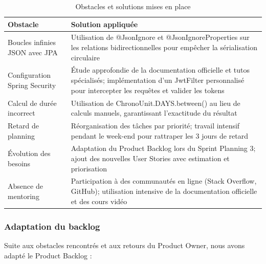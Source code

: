 \documentclass[12pt,a4paper]{report}
\begin{document}
\begin{table}[H]
\centering
\renewcommand{\arraystretch}{1.5}
\begin{tabularx}{\textwidth}{|>{\hsize=0.3\hsize}X|>{\hsize=0.7\hsize}X|}
\hline
\textbf{Obstacle} & \textbf{Solution appliquée} \\
\hline
Boucles infinies JSON avec JPA & Utilisation de @JsonIgnore et @JsonIgnoreProperties sur les relations bidirectionnelles pour empêcher la sérialisation circulaire \\
\hline
Configuration Spring Security & Étude approfondie de la documentation officielle et tutos spécialisés; implémentation d'un JwtFilter personnalisé pour intercepter les requêtes et valider les tokens \\
\hline
Calcul de durée incorrect & Utilisation de ChronoUnit.DAYS.between() au lieu de calculs manuels, garantissant l'exactitude du résultat \\
\hline
Retard de planning & Réorganisation des tâches par priorité; travail intensif pendant le week-end pour rattraper les 3 jours de retard \\
\hline
Évolution des besoins & Adaptation du Product Backlog lors du Sprint Planning 3; ajout des nouvelles User Stories avec estimation et priorisation \\
\hline
Absence de mentoring & Participation à des communautés en ligne (Stack Overflow, GitHub); utilisation intensive de la documentation officielle et des cours vidéo \\
\hline
\end{tabularx}
\caption{Obstacles et solutions mises en place}
\end{table}

\subsubsection{Adaptation du backlog}

Suite aux obstacles rencontrés et aux retours du Product Owner, nous avons adapté le Product Backlog :
\end{document}
